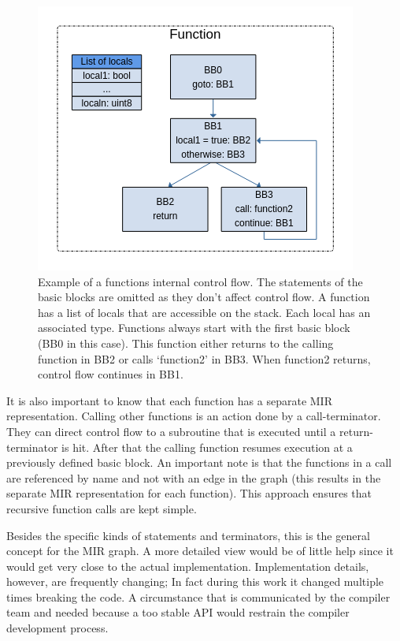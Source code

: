 \begin{figure}
    \centering
    \includegraphics[width=.7\textwidth]{../diagrams/Function.png}
    \caption{
        Example of a functions internal control flow.
        The statements of the basic blocks are omitted as they don't affect control flow.
        A function has a list of locals that are accessible on the stack.
        Each local has an associated type.
        Functions always start with the first basic block (BB0 in this case).
        This function either returns to the calling function in BB2
        or calls `function2' in BB3.
        When function2 returns, control flow continues in BB1.}
    \label{mir_fn}
\end{figure}

It is also important to know that each function has a separate MIR representation.
Calling other functions is an action done by a call-terminator.
They can direct control flow to a subroutine that is executed until a return-terminator is hit.
After that the calling function resumes execution at a previously defined basic block.
An important note is that the functions in a call are referenced by name and not with an edge in the graph (this results in the separate MIR representation for each function).
This approach ensures that recursive function calls are kept simple.

Besides the specific kinds of statements and terminators, this is the general concept for the MIR graph.
A more detailed view would be of little help since it would get very close to the actual implementation.
Implementation details, however, are frequently changing;
In fact during this work it changed multiple times breaking the code.
A circumstance that is communicated by the compiler team and needed because a too stable API would restrain the compiler development process.


